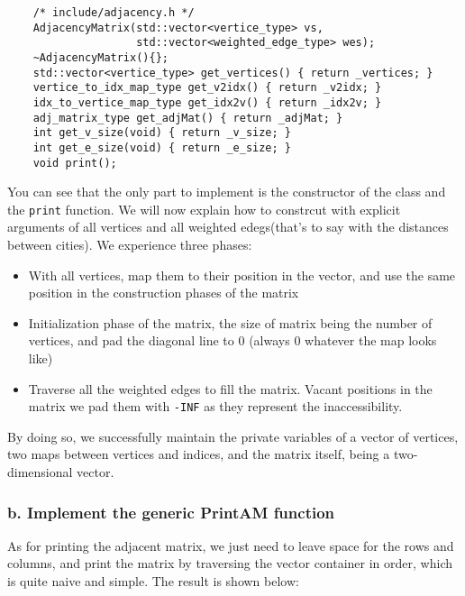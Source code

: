 \begin{verbatim}
    /* include/adjacency.h */
    AdjacencyMatrix(std::vector<vertice_type> vs, 
                    std::vector<weighted_edge_type> wes);
    ~AdjacencyMatrix(){};
    std::vector<vertice_type> get_vertices() { return _vertices; }
    vertice_to_idx_map_type get_v2idx() { return _v2idx; }
    idx_to_vertice_map_type get_idx2v() { return _idx2v; }
    adj_matrix_type get_adjMat() { return _adjMat; }
    int get_v_size(void) { return _v_size; }
    int get_e_size(void) { return _e_size; }
    void print();
\end{verbatim}

You can see that the only part to implement is the constructor of the class and the \verb|print| function. We will now explain how to constrcut with explicit arguments of all vertices and all weighted edegs(that's to say with the distances between cities). We experience three phases:

\begin{itemize}
    \item With all vertices, map them to their position in the vector, and use the same position in the construction phases of the matrix
    \item Initialization phase of the matrix, the size of matrix being the number of vertices, and pad the diagonal line to $0$ (always 0 whatever the map looks like)
    \item Traverse all the weighted edges to fill the matrix. Vacant positions in the matrix we pad them with \verb|-INF| as they represent the inaccessibility.
\end{itemize}

By doing so, we successfully maintain the private variables of a vector of vertices, two maps between vertices and indices, and the matrix itself, being a two-dimensional vector.

\subsubsection*{b. Implement the generic \textbf{PrintAM} function}
As for printing the adjacent matrix, we just need to leave space for the rows and columns, and print the matrix by traversing the vector container in order, which is quite naive and simple. The result is shown below:

